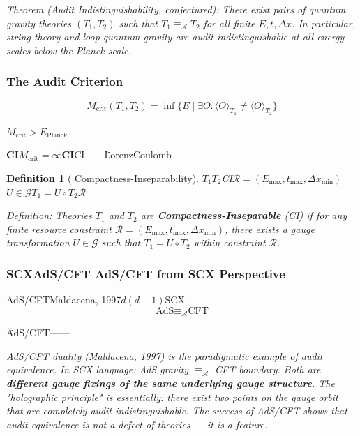 \documentclass[12pt,a4paper]{article}
\newtheorem{definition}[theorem]{Definition}
\theoremstyle{remark}
\newcommand{\A}{\mathcal{A}}
\begin{document}
\medskip
\noindent\textit{Theorem (Audit Indistinguishability, conjectured): There exist pairs of quantum gravity theories $(T_1, T_2)$ such that $T_1 \equiv_{\A} T_2$ for all finite $E, t, \Delta x$. In particular, string theory and loop quantum gravity are audit-indistinguishable at all energy scales below the Planck scale.}

\subsubsection{ The Audit Criterion}

\textbf{}
\begin{equation}
    M_{\text{crit}}(T_1, T_2) = \inf\{E \mid \exists O: \langle O \rangle_{T_1} \neq \langle O \rangle_{T_2}\}
\end{equation}

$M_{\text{crit}} > E_{\text{Planck}}$

\textbf{CI}$M_{\text{crit}} = \infty$\textbf{CI}CI——\"\"LorenzCoulomb

\begin{definition}[ Compactness-Inseparability]
$T_1$$T_2$\textbf{}CI$\mathcal{R} = (E_{\max}, t_{\max}, \Delta x_{\min})$$U \in \mathcal{G}$$T_1 = U \circ T_2$$\mathcal{R}$
\end{definition}

\medskip
\noindent\textit{Definition: Theories $T_1$ and $T_2$ are \textbf{Compactness-Inseparable} (CI) if for any finite resource constraint $\mathcal{R} = (E_{\max}, t_{\max}, \Delta x_{\min})$, there exists a gauge transformation $U \in \mathcal{G}$ such that $T_1 = U \circ T_2$ within constraint $\mathcal{R}$.}

\subsubsection{SCXAdS/CFT AdS/CFT from SCX Perspective}

AdS/CFTMaldacena, 1997$d$$(d-1)$SCX
\begin{equation}
    \text{AdS} \equiv_{\A} \text{CFT}
\end{equation}

\textbf{}\"\"

AdS/CFT——\textit{}

\medskip
\noindent\textit{AdS/CFT duality (Maldacena, 1997) is the paradigmatic example of audit equivalence. In SCX language: AdS gravity $\equiv_{\A}$ CFT boundary. Both are \textbf{different gauge fixings of the same underlying gauge structure}. The "holographic principle" is essentially: there exist two points on the gauge orbit that are completely audit-indistinguishable. The success of AdS/CFT shows that audit equivalence is not a defect of theories — it is a \textit{feature}.}
\end{document}
